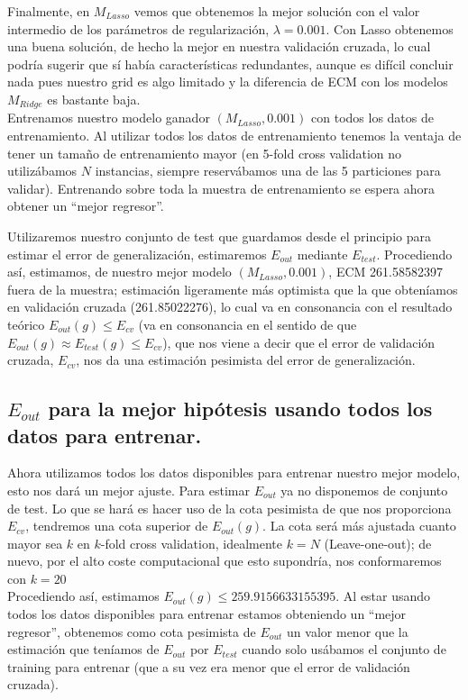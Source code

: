 \documentclass[11pt,a4paper]{article}
\theoremstyle{definition}
\begin{document}
	Finalmente, en $M_{Lasso}$ vemos que obtenemos la mejor solución con el valor intermedio de los parámetros de regularización, $\lambda = 0.001$. Con Lasso obtenemos una buena solución, de hecho la mejor en nuestra validación cruzada, lo cual podría sugerir que sí había características redundantes, aunque es difícil concluir nada pues nuestro grid es algo limitado y la diferencia de ECM con los modelos $M_{Ridge}$ es bastante baja. \\
	
	Entrenamos nuestro modelo ganador $(M_{Lasso},0.001)$ con todos los datos de entrenamiento. Al utilizar todos los datos de entrenamiento tenemos la ventaja de tener un tamaño de entrenamiento mayor (en 5-fold cross validation no utilizábamos $N$ instancias, siempre reservábamos una de las 5 particiones para validar). Entrenando sobre toda la muestra de entrenamiento se espera ahora obtener un ``mejor regresor''.
	
	 Utilizaremos nuestro conjunto de test que guardamos desde el principio para estimar el error de generalización, estimaremos $E_{out}$ mediante $E_{test}$. Procediendo así, estimamos, de nuestro mejor modelo $(M_{Lasso},0.001)$, ECM 261.58582397 fuera de la muestra; estimación ligeramente más optimista que la que obteníamos en validación cruzada (261.85022276), lo cual va en consonancia con el resultado teórico $E_{out}(g) \leq E_{cv}$ (va en consonancia en el sentido de que $E_{out}(g)\approx E_{test}(g)\leq E_{cv}$), que nos viene a decir que el error de validación cruzada, $E_{cv}$, nos da una estimación pesimista del error de generalización.
	
	\subsection{$E_{out}$ para la mejor hipótesis usando todos los datos para entrenar.}
	Ahora utilizamos todos los datos disponibles para entrenar nuestro mejor modelo, esto nos dará un mejor ajuste. Para estimar $E_{out}$ ya no disponemos de conjunto de test. Lo que se hará es hacer uso de la cota pesimista de que nos proporciona $E_{cv}$, tendremos una cota superior de $E_{out}(g)$. La cota será más ajustada cuanto mayor sea $k$ en $k$-fold cross validation, idealmente $k=N$ (Leave-one-out); de nuevo, por el alto coste computacional que esto supondría, nos conformaremos con $k=20$\\
	Procediendo así, estimamos $E_{out}(g)\leq 259.9156633155395$. Al estar usando todos los datos disponibles para entrenar estamos obteniendo un ``mejor regresor'', obtenemos como cota pesimista de $E_{out}$ un valor menor que la estimación que teníamos de $E_{out}$ por $E_{test}$ cuando solo usábamos el conjunto de training para entrenar (que a su vez era menor que el error de validación cruzada).
	
\end{document}
